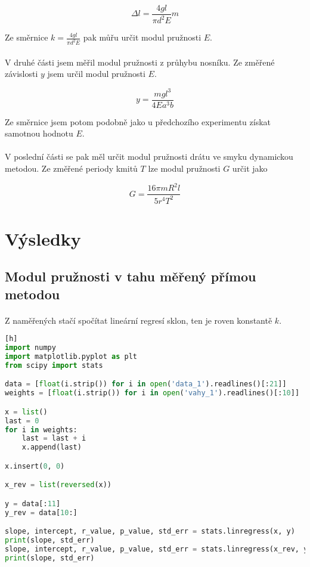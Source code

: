 \documentclass[a4paper,11pt]{article}
\begin{document}
    \begin{equation}
        \Delta l = \frac{4 g l}{\pi d^{2} E} m 
    \end{equation}

    Ze směrnice $k = \frac{4 g l}{\pi d^{2} E}$ pak můřu určit modul pružnosti $E$.

    \paragraph{} V druhé části jsem měřil modul pružnosti z průhybu nosníku. Ze změřené
    závislosti $y$ jsem určil modul pružnosti $E$. 

    \begin{equation}
        y = \frac{m g l^{3}}{4 E a^{3} b}
    \end{equation}

    Ze směrnice jsem potom podobně jako u předchozího experimentu získat samotnou
    hodnotu $E$.

    \paragraph{} V poslední části se pak měl určit modul pružnosti drátu ve smyku
    dynamickou metodou. Ze změřené periody kmitů $T$ lze modul pružnosti $G$ určit
    jako

    \begin{equation}
        G = \frac{16 \pi m R^{2} l}{5 r^{4} T^{2}}
    \end{equation}

\section{Výsledky}

    \subsection{Modul pružnosti v tahu měřený přímou metodou}

        \paragraph{} Z naměřených stačí spočítat lineární regresí sklon, ten
        je roven konstantě $k$.

\begin{lstlisting}[language=Python][h]
import numpy
import matplotlib.pyplot as plt
from scipy import stats

data = [float(i.strip()) for i in open('data_1').readlines()[:21]]
weights = [float(i.strip()) for i in open('vahy_1').readlines()[:10]]

x = list()
last = 0
for i in weights:
    last = last + i
    x.append(last)

x.insert(0, 0)

x_rev = list(reversed(x))

y = data[:11]
y_rev = data[10:]

slope, intercept, r_value, p_value, std_err = stats.linregress(x, y)
print(slope, std_err)
slope, intercept, r_value, p_value, std_err = stats.linregress(x_rev, y_rev)
print(slope, std_err)\end{lstlisting}
\end{document}
